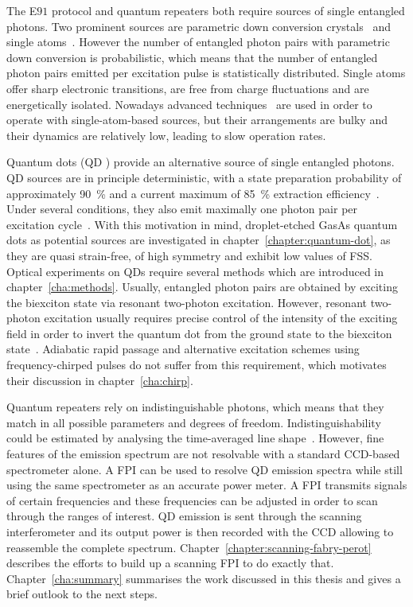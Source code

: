 The E$91$ protocol and quantum repeaters both require sources of single entangled photons.
Two prominent sources are parametric down conversion crystals~\cite{shih_new_1988} and single atoms~\cite{norden_entangled_2018}\cite{aspect_experimental_1981}.
However the number of entangled photon pairs with parametric down conversion is probabilistic, which means that the number of entangled photon pairs emitted per excitation pulse is statistically distributed.
Single atoms offer sharp electronic transitions, are free from charge fluctuations and are energetically isolated.
Nowadays advanced techniques~\cite{kuhn_deterministic_2002} are used in order to operate with single-atom-based sources, but their arrangements are bulky and their dynamics are relatively low, leading to slow operation rates.

Quantum dots (\acs{QD} ) provide an alternative source of single entangled photons.
\ac{QD} sources are in principle deterministic, with a state preparation probability of approximately \SI{90}{\percent} and a current maximum of \SI{85}{\percent} extraction efficiency~\cite{liu_solid-state_2019}.
Under several conditions, they also emit maximally one photon pair per excitation cycle~\cite{schweickert_-demand_2018}.
With this motivation in mind, droplet-etched GasAs quantum dots as potential sources are investigated in chapter~\ref{chapter:quantum-dot}, as they are quasi strain-free, of high symmetry and exhibit low values of \ac{FSS}.
Optical experiments on \acp{QD} require several methods which are introduced in chapter~\ref{cha:methods}. 
Usually, entangled photon pairs are obtained by exciting the biexciton state via resonant two-photon excitation.
However, resonant two-photon excitation usually requires precise control of the intensity of the exciting field in order to invert the quantum dot from the ground state to the biexciton state~\cite{jayakumar_deterministic_2013}.
Adiabatic rapid passage and alternative excitation schemes using frequency-chirped pulses do not suffer from this requirement, which motivates their discussion in chapter~\ref{cha:chirp}.

Quantum repeaters rely on indistinguishable photons, which means that they match in all possible parameters and degrees of freedom.
Indistinguishability could be estimated by analysing the time-averaged line shape~\cite{reindl_all-photonic_2018}. However, fine features of the emission spectrum are not resolvable with a standard CCD-based spectrometer alone.
A \ac{FPI} can be used to resolve \ac{QD} emission spectra while still using the same spectrometer as an accurate power meter.
A \ac{FPI} transmits signals of certain frequencies and these frequencies can be adjusted in order to scan through the ranges of interest.
\ac{QD} emission is sent through the scanning interferometer and its output power is then recorded with the CCD allowing to reassemble the complete spectrum.
Chapter~\ref{chapter:scanning-fabry-perot} describes the efforts to build up a scanning \ac{FPI} to do exactly that.
Chapter~\ref{cha:summary} summarises the work discussed in this thesis and gives a brief outlook to the next steps.

